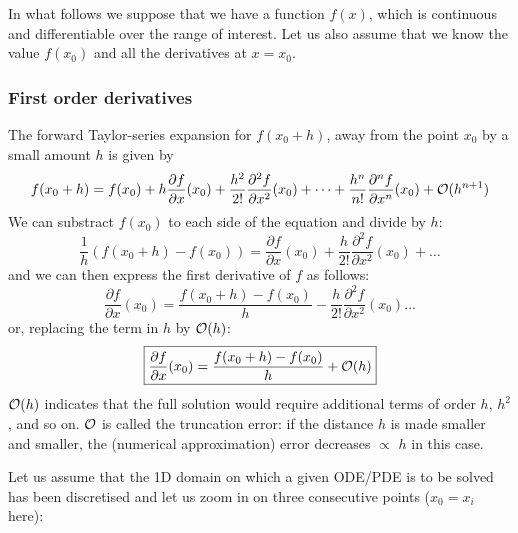 In what follows we suppose that we have a function $f(x)$, 
which is continuous and differentiable over the range of interest. 
Let us also assume that we know the value $f(x_0)$ and all the derivatives at $x = x_0$. 

\subsubsection{First order derivatives}

The forward Taylor-series expansion for $f(x_0 + h)$, away 
from the point $x_0$ by a small amount $h$ is given by
\begin{equation}
f(x_0+h)=f(x_0)+ 
h \frac{\partial f}{\partial x}(x_0)  + 
\frac{h^2}{2!} \frac{\partial^2 f}{\partial x^2}(x_0)  +
\dots  +
\frac{h^n}{n!} \frac{\partial^n f}{\partial x^n}(x_0)  
+ {\cal O}(h^{n+1})
\end{equation}
We can substract $f(x_0)$ to each side of the equation and divide by $h$:
\begin{equation}
\frac{1}{h} \left(f(x_0+h)-f(x_0)\right) = 
 \frac{\partial f}{\partial x}(x_0)  + 
\frac{h}{2!} \frac{\partial^2 f}{\partial x^2}(x_0)  + \dots 
\end{equation}
and we can then express the first derivative of $f$ as follows:
\begin{equation}
\frac{\partial f}{\partial x}(x_0) = \frac{f(x_0+h)-f(x_0)}{h} - 
\frac{h}{2!} \frac{\partial^2 f}{\partial x^2}(x_0)  \dots
\end{equation}
or, replacing the term in $h$ by ${\cal O}(h)$:
\begin{equation}
\boxed{
\frac{\partial f}{\partial x}(x_0) = \frac{f(x_0+h)-f(x_0)}{h} + {\cal O}(h)
}
\end{equation}
${\cal O}(h)$ indicates that the full solution would require additional terms of order $h$, $h^2$, 
and so on. ${\cal O}$ is called the {\color{olive}truncation error}: if the distance $h$ 
is made smaller and smaller, the (numerical approximation) error decreases $\propto$ $h$ in this case.


Let us assume that the 1D domain on which a given ODE/PDE is to be solved has been discretised
and let us zoom in on three consecutive points ($x_0=x_i$ here):

\begin{center}

\end{center}


